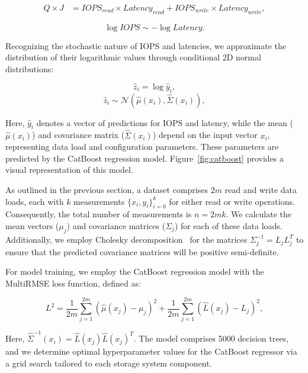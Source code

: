 \begin{equation}
\begin{split}
Q \times J & = IOPS_{read} \times Latency_{read} + IOPS_{write} \times Latency_{write},
\end{split}
\label{eq:little}
\end{equation}

\begin{equation}
\log IOPS \sim -\log Latency.
\end{equation}

Recognizing the stochastic nature of IOPS and latencies, we approximate the distribution of their logarithmic values through conditional 2D normal distributions:

\begin{equation}
\hat{z}_i = \log \hat{y}_i,
\end{equation}
\begin{equation}
\hat{z}_i \sim \mathcal{N}(\hat{\mu}(x_i), \hat{\Sigma}(x_i)),
\end{equation}

Here, $\hat{y}_i$ denotes a vector of predictions for IOPS and latency, while the mean ($\hat{\mu}(x_i)$) and covariance matrix ($\hat{\Sigma}(x_i)$) depend on the input vector $x_i$, representing data load and configuration parameters. These parameters are predicted by the CatBoost regression model. Figure~\ref{fig:catboost} provides a visual representation of this model.

As outlined in the previous section, a dataset comprises $2m$ read and write data loads, each with $k$ measurements $\{x_i, y_i\}_{i=0}^{k}$ for either read or write operations. Consequently, the total number of measurements is $n=2mk$. We calculate the mean vectors ($\mu_j$) and covariance matrices ($\Sigma_j$) for each of these data loads. Additionally, we employ Cholesky decomposition~\cite{10.5555/248979} for the matrices $\Sigma_j^{-1}=L_jL_j^T$ to ensure that the predicted covariance matrices will be positive semi-definite.

For model training, we employ the CatBoost regression model with the MultiRMSE loss function, defined as:

\begin{equation}
L^2 = \frac{1}{2m}\sum_{j=1}^{2m} (\hat{\mu}(x_j)-\mu_j)^2 + \frac{1}{2m}\sum_{j=1}^{2m} (\hat{L}(x_j)-L_j)^2,
\end{equation}

Here, $\hat{\Sigma}^{-1}(x_i)=\hat{L}(x_j)\hat{L}(x_j)^T$. The model comprises 5000 decision trees, and we determine optimal hyperparameter values for the CatBoost regressor via a grid search tailored to each storage system component.

